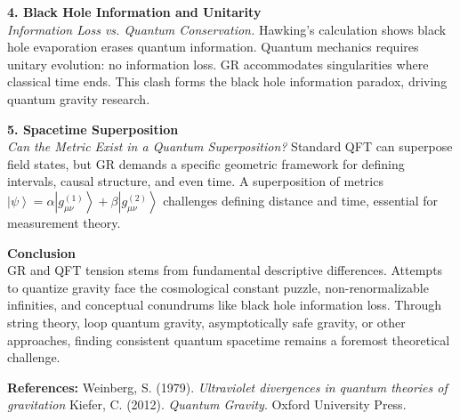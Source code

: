 \begin{technical}
    \noindent\textbf{4. Black Hole Information and Unitarity}\\[0.5em]
    \textit{Information Loss vs. Quantum Conservation.}
    Hawking's calculation shows black hole evaporation erases quantum information. Quantum mechanics requires unitary evolution: no information loss. GR accommodates singularities where classical time ends. This clash forms the black hole information paradox, driving quantum gravity research.

    \noindent\textbf{5. Spacetime Superposition}\\[0.5em]
    \textit{Can the Metric Exist in a Quantum Superposition?}
    Standard QFT can superpose field states, but GR demands a specific geometric framework for defining intervals, causal structure, and even time. A superposition of metrics $\left|\psi\right> = \alpha \left|g_{\mu\nu}^{(1)}\right> + \beta \left|g_{\mu\nu}^{(2)}\right>$ challenges defining distance and time, essential for measurement theory.

    \noindent\textbf{Conclusion}\\[0.5em]
    GR and QFT tension stems from fundamental descriptive differences. Attempts to quantize gravity face the cosmological constant puzzle, non-renormalizable infinities, and conceptual conundrums like black hole information loss. Through string theory, loop quantum gravity, asymptotically safe gravity, or other approaches, finding consistent quantum spacetime remains a foremost theoretical challenge.

    \vspace{0.5em}
    \noindent\textbf{References:}
    Weinberg, S. (1979). \textit{Ultraviolet divergences in quantum theories of gravitation}
    Kiefer, C. (2012). \textit{Quantum Gravity}. Oxford University Press.

\end{technical}
